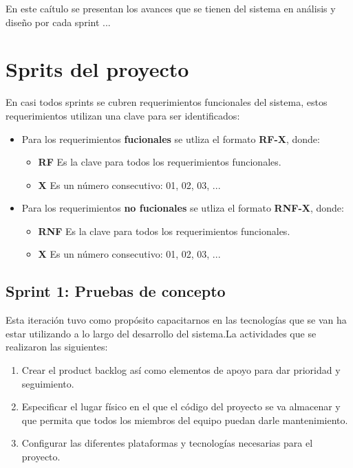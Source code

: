 En este caítulo se presentan los avances que se tienen del sistema en análisis y diseño por cada sprint ...

\section{Sprits del proyecto}
En casi todos sprints se cubren requerimientos funcionales del sistema, estos requerimientos utilizan una 
clave para ser identificados:

\begin{itemize}
	\item Para los requerimientos \textbf{fucionales} se utliza el formato \textbf{RF-X}, donde:
    \begin{itemize}
        \item \textbf{RF} Es la clave para todos los requerimientos funcionales.
        \item \textbf{X} Es un número consecutivo: 01, 02, 03, ...
    \end{itemize}

    \item Para los requerimientos \textbf{no fucionales} se utliza el formato \textbf{RNF-X}, donde:
    \begin{itemize}
        \item \textbf{RNF} Es la clave para todos los requerimientos funcionales.
        \item \textbf{X} Es un número consecutivo: 01, 02, 03, ...
    \end{itemize}
\end{itemize}

\subsection{Sprint 1: Pruebas de concepto}
Esta iteración tuvo como propósito capacitarnos en las tecnologías que se van ha estar utilizando 
a lo largo del desarrollo del sistema.La actividades que se realizaron las siguientes:

\begin{enumerate}
    \item Crear el product backlog así como elementos de apoyo para dar prioridad y seguimiento.
    \item Especificar el lugar físico en el que el código del proyecto se va almacenar y que permita que
    todos los miembros del equipo puedan darle mantenimiento.
    \item Configurar las diferentes plataformas y tecnologías necesarias para el proyecto.
\end{enumerate}

